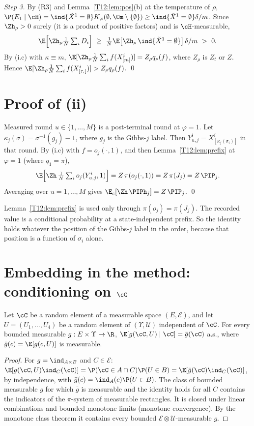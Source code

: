 \documentclass[11pt]{report}
\begin{document}
\emph{Step 3.} By (R3) and Lemma~\ref{T12:lem:pos}(b) at the temperature of $\rho$, $\P(E_1\mid\cH)=\ind\{\tilde X^1=\emptyset\}K_\varphi(\emptyset,\Om\setminus\{\emptyset\})\ge\ind\{\tilde X^1=\emptyset\}\delta/m$. Since $\Zh_\rho>0$ surely (it is a product of positive factors) and is $\cH$-measurable,
\[ \E\Big[\Zh_\rho\tfrac1N\textstyle\sum_iD_i\Big]\ \ge\ \tfrac1N\E\big[\Zh_\rho\,\ind\{\tilde X^1=\emptyset\}\big]\,\delta/m\ >\ 0 . \]
By (i.c) with $\kappa\equiv m$, $\E[\Zh_\rho\frac1N\sum_if(X^i_{[m]})]=Z_\rho q_\rho(f)$, where $Z_\rho$ is $Z_t$ or $Z$. Hence $\E[\Zh_\rho\frac1N\sum_if(X^i_{[\tau_i]})]>Z_\rho q_\rho(f)$. \qed

\section{Proof of (ii)}

Measured round $u\in\{1,\dots,M\}$ is a post-terminal round at $\varphi=1$. Let $\kappa_j(\sigma)=\sigma^{-1}(g_j)-1$, where $g_j$ is the Gibbs-$j$ label. Then $Y^i_{u,j}=X^i_{[\kappa_j(\sigma_i)]}$ in that round. By (i.c) with $f=o_j(\cdot,1)$, and then Lemma~\ref{T12:lem:prefix} at $\varphi=1$ (where $q_1=\pi$),
\[ \E\Big[\Zh\,\tfrac1N\textstyle\sum_io_j(Y^i_{u,j},1)\Big]=Z\,\pi(o_j(\cdot,1))=Z\,\pi(J_j)=Z\,\PIP_j . \]
Averaging over $u=1,\dots,M$ gives $\E_c[\Zh\,\PIPh_j]=Z\,\PIP_j$. \qed

\begin{T12remark}
Lemma~\ref{T12:lem:prefix} is used only through $\pi(o_j)=\pi(J_j)$. The recorded value is a conditional probability at a state-independent prefix. So the identity holds whatever the position of the Gibbs-$j$ label in the order, because that position is a function of $\sigma_i$ alone.
\end{T12remark}

\section{Embedding in the method: conditioning on $\cC$}

\begin{T12lemma}[freezing]\label{T12:lem:freeze}
Let $\cC$ be a random element of a measurable space $(E,\mathcal E)$, and let $U=(U_1,\dots,U_4)$ be a random element of $(\Upsilon,\mathcal U)$ independent of $\cC$. For every bounded measurable $g:E\times\Upsilon\to\R$, $\E[g(\cC,U)\mid\cC]=\bar g(\cC)$ a.s., where $\bar g(c)=\E[g(c,U)]$ is measurable.
\end{T12lemma}
\begin{proof}
For $g=\ind_{A\times B}$ and $C\in\mathcal E$: $\E[g(\cC,U)\ind_C(\cC)]=\P(\cC\in A\cap C)\P(U\in B)=\E[\bar g(\cC)\ind_C(\cC)]$, by independence, with $\bar g(c)=\ind_A(c)\P(U\in B)$. The class of bounded measurable $g$ for which $\bar g$ is measurable and the identity holds for all $C$ contains the indicators of the $\pi$-system of measurable rectangles. It is closed under linear combinations and bounded monotone limits (monotone convergence). By the monotone class theorem it contains every bounded $\mathcal E\otimes\mathcal U$-measurable $g$.
\end{proof}
\end{document}
